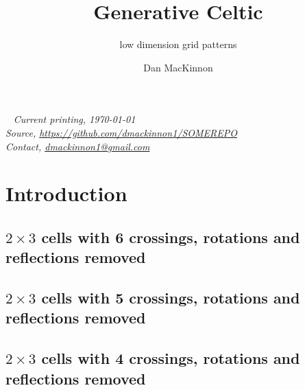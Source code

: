 \documentclass{tufte-book}
\title{Generative Celtic}
\subtitle{low dimension grid patterns}
\author[]{Dan MacKinnon}
\begin{document}
\maketitle


\newpage
\begin{fullwidth}
~\vfill
\thispagestyle{empty}
\setlength{\parindent}{0pt}
\textit{Current printing, \today}\\
\textit{Source, \url{https://github.com/dmackinnon1/SOMEREPO}}\\
\textit{Contact, \href{mailto://dmackinnon1@gmail.com}{dmackinnon1@gmail.com}}
\end{fullwidth}

\cleardoublepage

\chapter*{Introduction}

\newpage





\newpage
\section{$2\times 3$ cells with 6 crossings, rotations and reflections removed}

%

\newpage
\section{$2\times 3$ cells with 5 crossings, rotations and reflections removed}

%

\newpage
\section{$2\times 3$ cells with 4 crossings, rotations and reflections removed}

\end{document}
